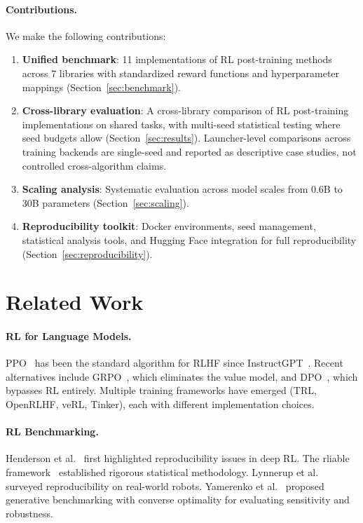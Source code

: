 \documentclass[manuscript,review,anonymous]{acmart}
\begin{document}
\paragraph{Contributions.} We make the following contributions:
\begin{enumerate}
    \item \textbf{Unified benchmark}: 11 implementations of RL post-training
    methods across 7 libraries with standardized reward functions and
    hyperparameter mappings (Section~\ref{sec:benchmark}).
    \item \textbf{Cross-library evaluation}: A cross-library comparison of RL
    post-training implementations on shared tasks, with multi-seed statistical
    testing where seed budgets allow (Section~\ref{sec:results}). Launcher-level
    comparisons across training backends are single-seed and reported as
    descriptive case studies, not controlled cross-algorithm claims.
    \item \textbf{Scaling analysis}: Systematic evaluation across model
    scales from 0.6B to 30B parameters (Section~\ref{sec:scaling}).
    \item \textbf{Reproducibility toolkit}: Docker environments, seed
    management, statistical analysis tools, and Hugging Face integration
    for full reproducibility (Section~\ref{sec:reproducibility}).
\end{enumerate}

\section{Related Work}
\label{sec:related}

\paragraph{RL for Language Models.}
PPO~\cite{schulman2017proximal} has been the standard algorithm for RLHF since
InstructGPT~\cite{ouyang2022training}. Recent alternatives include
GRPO~\cite{shao2024deepseekmath}, which eliminates the value model, and
DPO~\cite{rafailov2024direct}, which bypasses RL entirely. Multiple training
frameworks have emerged (TRL, OpenRLHF, veRL, Tinker), each with different
implementation choices.

\paragraph{RL Benchmarking.}
Henderson et al.~\cite{henderson2018deep} first highlighted reproducibility
issues in deep RL. The rliable framework~\cite{agarwal2021deep} established
rigorous statistical methodology. Lynnerup et al.~\cite{lynnerup2019survey}
surveyed reproducibility on real-world robots. Yamerenko et al.~\cite{yamerenko2025generating}
proposed generative benchmarking with converse optimality for evaluating
sensitivity and robustness.
\end{document}
